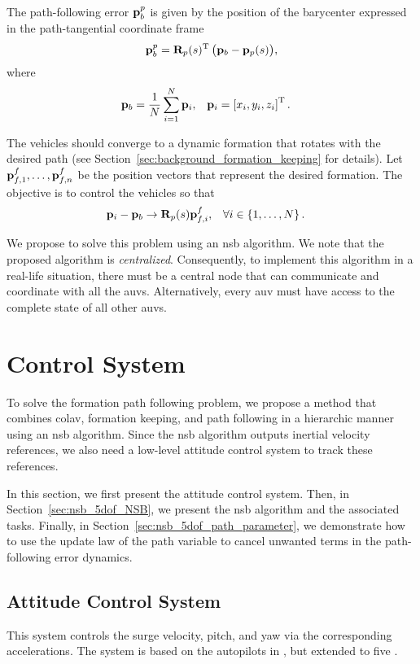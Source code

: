 The path-following error $\mathbf{p}_b^p$ is given by the position of the barycenter expressed in the path-tangential coordinate frame
\begin{equation}
    \mathbf{p}_b^p = \mathbf{R}_p(s)^{\mathrm{T}} \, \big(\mathbf{p}_b - \mathbf{p}_p(s)\big), \label{eq:nsb_5dof_barycenter}
\end{equation}
where
\begin{align}
    \mathbf{p}_b &= \frac{1}{N} \sum_{i=1}^N \mathbf{p}_i, & 
    \mathbf{p}_i &= \left[x_i, y_i, z_i\right]^{\mathrm{T}}.
\end{align}

The vehicles should converge to a dynamic formation that rotates with the desired path (see Section~\ref{sec:background_formation_keeping} for details).
Let $\mathbf{p}_{f,1}^f, \ldots, \mathbf{p}_{f,n}^f$ be the position vectors that represent the desired formation.
The objective is to control the vehicles so that
\begin{align}
    \mathbf{p}_i - \mathbf{p}_b &\rightarrow \mathbf{R}_p(s) \mathbf{p}_{f,i}^f, &
    \forall i &\in \left\{1, \ldots, N \right\}.
\end{align}

We propose to solve this problem using an \gls{nsb} algorithm.
We note that the proposed algorithm is \emph{centralized}.
Consequently, to implement this algorithm in a real-life situation, there must be a central node that can communicate and coordinate with all the \glspl{auv}.
Alternatively, every \gls{auv} must have access to the complete state of all other \glspl{auv}.

\section{Control System}
\label{sec:nsb_5dof_control}
To solve the formation path following problem, we propose a method that combines \acrfull{colav}, formation keeping, and path following in a hierarchic manner using an \gls{nsb} algorithm.
Since the \gls{nsb} algorithm outputs inertial velocity references, we also need a low-level attitude control system to track these references.

In this section, we first present the attitude control system.
Then, in Section~\ref{sec:nsb_5dof_NSB}, we present the \gls{nsb} algorithm and the associated tasks.
Finally, in Section~\ref{sec:nsb_5dof_path_parameter}, we demonstrate how to use the update law of the path variable to cancel unwanted terms in the path-following error dynamics.

\subsection{Attitude Control System}
\label{sec:nsb_5dof_ACS}
This system controls the surge velocity, pitch, and yaw via the corresponding accelerations.
The system is based on the autopilots in \cite{moe_LOS_2016}, but extended to five .

